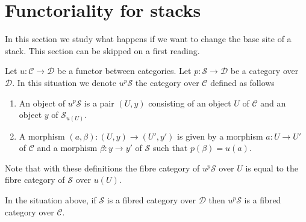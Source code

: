 \section{Functoriality for stacks}
\label{section-inverse-image}

\noindent
In this section we study what happens if we want to change the base site
of a stack. This section can be skipped on a first reading.

\medskip\noindent
Let $u : \mathcal{C} \to \mathcal{D}$ be a functor between categories.
Let $p : \mathcal{S} \to \mathcal{D}$ be a category over $\mathcal{D}$.
In this situation we denote $u^p\mathcal{S}$ the category over $\mathcal{C}$
defined as follows
\begin{enumerate}
\item An object of $u^p\mathcal{S}$ is a pair $(U, y)$ consisting
of an object $U$ of $\mathcal{C}$ and an object $y$ of $\mathcal{S}_{u(U)}$.
\item A morphism $(a, \beta) : (U, y) \to (U', y')$ is given by
a morphism $a : U \to U'$ of $\mathcal{C}$ and a morphism $\beta : y \to y'$
of $\mathcal{S}$ such that $p(\beta) = u(a)$.
\end{enumerate}
Note that with these definitions the fibre category of
$u^p\mathcal{S}$ over $U$ is equal to the fibre category of
$\mathcal{S}$ over $u(U)$.

\begin{lemma}
\label{lemma-fibred-category-pushforward}
In the situation above, if $\mathcal{S}$ is a fibred category over
$\mathcal{D}$ then $u^p\mathcal{S}$ is a fibred category over $\mathcal{C}$.
\end{lemma}

